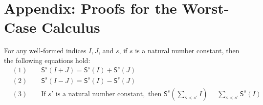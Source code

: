 \chapter{Appendix: Proofs for the Worst-Case Calculus}\label{chap:appendix1}

\begin{appaprop}
\label{appa:shift-dist}
For any well-formed indices $I, J$, and $s$, if $s$ is a natural number constant, then the following equations hold:
\begin{align*}
  &(1) \qquad \mathsf{S}^s(I+J)
  = \mathsf{S}^s(I)+\mathsf{S}^s(J)\\
  &(2)\qquad \mathsf{S}^s(I-J)
  = \mathsf{S}^s(I)-\mathsf{S}^s(J)\\
  &(3)\qquad \text{If } s' \text{ is a natural number constant}, \text{ then }\mathsf{S}^s\left(\textstyle\sum_{\kappa<s'}I\right)
  = \textstyle\sum_{\kappa<s'}\mathsf{S}^s(I)
\end{align*}
\end{appaprop}

